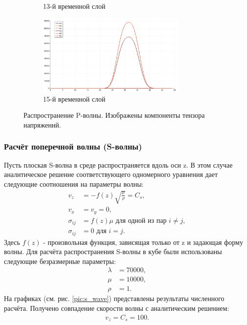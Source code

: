 \begin{figure}[htp]
\begin{subfigure}[b]{0.5\textwidth}
\caption{13-й временной слой}
\end{subfigure}
\begin{subfigure}[b]{0.5\textwidth}
\centering
\includegraphics[width=0.8\textwidth]{png/p-wave-test/s/0015.png}
\caption{15-й временной слой}
\end{subfigure}
\caption{Распространение P-волны. Изображены компоненты тензора напряжений.}
\label{pic:p_wave}
\end{figure}


\subsubsection{Расчёт поперечной волны (S-волны)}
Пусть плоская S-волна в среде распространяется вдоль оси z. В этом случае аналитическое решение соответствующего одномерного уравнения дает следующие соотношения на параметры волны:
\begin{align}
v_z&=-f(z)\sqrt{\frac{\mu}{\rho}}=C_s, \nonumber\\
v_x&=v_y=0, \nonumber\\
\sigma_{ij}&=f(z)\mu \textrm{ для одной из пар } i \neq j, \nonumber\\
\sigma_{ij}&=0 \textrm{ для } i = j.
\end{align}
Здесь $f(z)$ - произвольная функция, зависящая только от z и задающая форму волны.
Для расчёта распространения S-волны в кубе были использованы следующие безразмерные параметры: 
\begin{align}
\lambda&=70000, \nonumber\\
\mu&=10000, \nonumber\\
\rho&=1.
\end{align}
На графиках (см. рис. \ref{pic:s_wave}) представлены результаты численного расчёта. Получено совпадение скорости волны с аналитическим решением:
\begin{align}
v_z=C_s=100.
\end{align}

